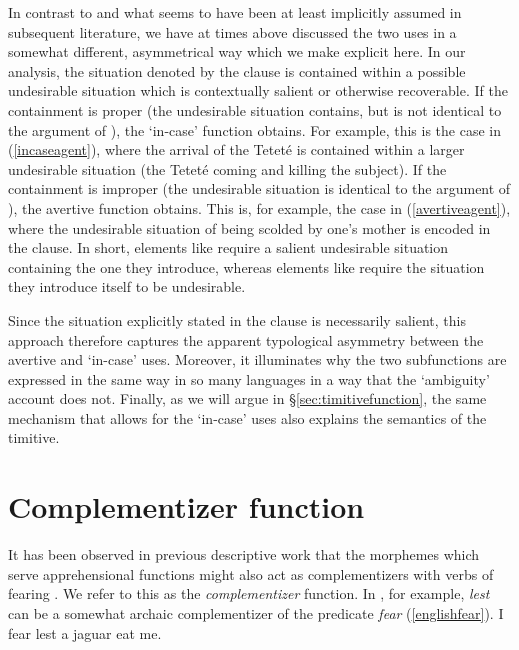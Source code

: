 \documentclass[output=paper,colorlinks,citecolor=brown]{langscibook}
\begin{document}
In contrast to \citet{lichtenberk1995apprehensional} and what seems to have been at least implicitly assumed in subsequent literature, we have at times above discussed the two uses in a somewhat different, asymmetrical way which we make explicit here. In our analysis, the situation denoted by the  clause is contained within a possible undesirable situation which is contextually salient or otherwise recoverable. If the containment is proper (\ie the undesirable situation contains, but is not identical to the argument of \sane), the `in-case' function obtains. For example, this is the case in (\ref{incaseagent}), where the arrival of the Teteté is contained within a larger undesirable situation (the Teteté coming and killing the subject). If the containment is improper (\ie the undesirable situation is identical to the argument of  \sane), the avertive function obtains. This is, for example, the case in (\ref{avertiveagent}), where the undesirable situation of being scolded by one's mother is encoded in the  clause. In short, elements like   require a salient undesirable situation containing the one they introduce, whereas elements like   require the situation they introduce itself to be undesirable.

Since the situation explicitly stated in the  clause is necessarily salient, this approach therefore captures the apparent typological asymmetry between the avertive and `in-case' uses. Moreover, it illuminates why the two subfunctions are expressed in the same way in so many languages in a way that the `ambiguity' account does not. Finally, as we will argue in \S\ref{sec:timitivefunction}, the same mechanism that allows for the `in-case' uses also explains the semantics of the timitive.




\section{Complementizer function} \label{sec:complementizerfunction}

It has been observed in previous descriptive work that the morphemes which serve apprehensional functions might also act as complementizers with verbs of fearing \citep{lichtenberk1995apprehensional, dobrushina2017fear, wiemer2018major}. We refer to this as the \emph{complementizer} function. In , for example, \emph{lest} can be a somewhat archaic complementizer of the predicate \emph{fear} (\ref{englishfear}).
    \ea \label{englishfear}
    \glt I fear lest a jaguar eat me.
    \z
\end{document}
